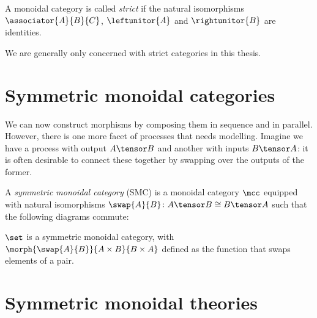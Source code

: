 \begin{definition}
    A monoidal category is called \emph{strict} if the natural isomorphisms \(
        \associator{A}{B}{C}
    \), \(
        \leftunitor{A}
    \) and \(
        \rightunitor{B}
    \) are identities.
\end{definition}

We are generally only concerned with strict categories in this thesis.

\section{Symmetric monoidal categories}

We can now construct morphisms by composing them in sequence and in parallel.
However, there is one more facet of processes that needs modelling.
Imagine we have a process with output \(A \tensor B\) and another with inputs
\(B \tensor A\): it is often desirable to connect these together by swapping
over the outputs of the former.

\begin{definition}
    \label{def:symmetric-monoidal-category}
    A \emph{symmetric monoidal category} (SMC) is a monoidal category \(\mcc\)
    equipped with natural isomorphisms \(
        \swap{A}{B} \colon A \tensor B \cong B \tensor A
    \) such that the following diagrams commute:
    \begin{center}
        
        

        \vspace{1em}

        
    \end{center}
\end{definition}

\begin{example}
    \(\set\) is a symmetric monoidal category, with \(
        \morph{\swap{A}{B}}{A \times B}{B \times A}
    \) defined as the function that swaps elements of a pair.
\end{example}

\section{Symmetric monoidal theories}

